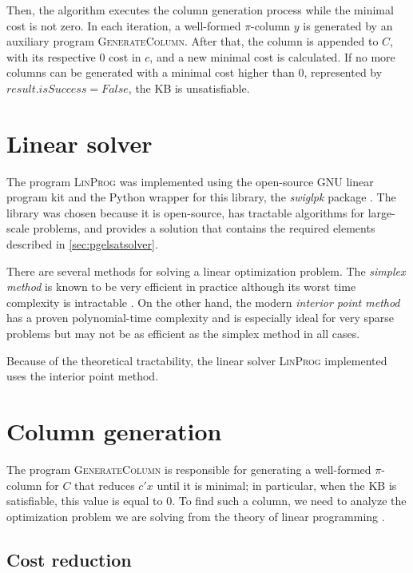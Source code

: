 Then, the algorithm executes the column generation process while the minimal cost is not zero. In each iteration, a well-formed $\pi$-column $y$ is generated by an auxiliary program \textsc{GenerateColumn}. After that, the column is appended to $C$, with its respective $0$ cost in $c$, and a new minimal cost is calculated. If no more columns can be generated with a minimal cost higher than $0$, represented by $result.isSuccess = False$, the KB is unsatisfiable.

\section{Linear solver}
The program \textsc{LinProg} was implemented using the open-source GNU linear program kit \citep{makhorin2001gnu} and the Python wrapper for this library, the \emph{swiglpk} package \citep{swiglpk}. The library was chosen because it is open-source, has tractable algorithms for large-scale problems, and provides a solution that contains the required elements described in \cref{sec:pgelsatsolver}.

There are several methods for solving a linear optimization problem. The \emph{simplex method} is known to be very efficient in practice \citep{borgwardt2012simplex} although its worst time complexity is intractable \citep{klee1972good}. On the other hand, the modern \emph{interior point method} has a proven polynomial-time complexity and is especially ideal for very sparse problems \citep{boyd2004convex} but may not be as efficient as the simplex method in all cases.

Because of the theoretical tractability, the linear solver \textsc{LinProg} implemented uses the interior point method.

\section{Column generation}
The program \textsc{GenerateColumn} is responsible for generating a well-formed $\pi$-column for $C$ that reduces $c' x$ until it is minimal; in particular, when the KB is satisfiable, this value is equal to 0. To find such a column, we need to analyze the optimization problem we are solving from the theory of linear programming \citep{bertsimas1997introduction}.

\subsection{Cost reduction}

